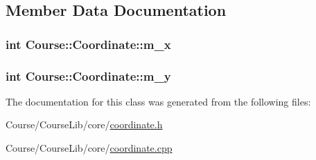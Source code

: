 \subsection{Member Data Documentation}
\hypertarget{classCourse_1_1Coordinate_ae82deff5e92295185e9a32256b970dac}{
\subsubsection[{m\-\_\-x}]{\setlength{\rightskip}{0pt plus 5cm}int Course\-::\-Coordinate\-::m\-\_\-x\hspace{0.3cm}{\ttfamily [private]}}}\label{classCourse_1_1Coordinate_ae82deff5e92295185e9a32256b970dac}
\hypertarget{classCourse_1_1Coordinate_a387f476965085a956cbb512315488f13}{
\subsubsection[{m\-\_\-y}]{\setlength{\rightskip}{0pt plus 5cm}int Course\-::\-Coordinate\-::m\-\_\-y\hspace{0.3cm}{\ttfamily [private]}}}\label{classCourse_1_1Coordinate_a387f476965085a956cbb512315488f13}


The documentation for this class was generated from the following files\-:\begin{DoxyCompactItemize}
\item 
Course/\-Course\-Lib/core/\hyperlink{coordinate_8h}{coordinate.\-h}\item 
Course/\-Course\-Lib/core/\hyperlink{coordinate_8cpp}{coordinate.\-cpp}\end{DoxyCompactItemize}
